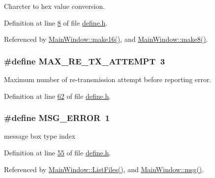 Charcter to hex value conversion. 



Definition at line \hyperlink{a00034_source_l00008}{8} of file \hyperlink{a00034_source}{define.\+h}.



Referenced by \hyperlink{a00048_source_l00013}{Main\+Window\+::make16()}, and \hyperlink{a00048_source_l00005}{Main\+Window\+::make8()}.

\hypertarget{a00034_ae024113875b4670b57f70611ff982543}{
\subsubsection[{M\+A\+X\+\_\+\+R\+E\+\_\+\+T\+X\+\_\+\+A\+T\+T\+E\+M\+P\+T}]{\setlength{\rightskip}{0pt plus 5cm}\#define M\+A\+X\+\_\+\+R\+E\+\_\+\+T\+X\+\_\+\+A\+T\+T\+E\+M\+P\+T~3}}\label{a00034_ae024113875b4670b57f70611ff982543}


Maximum number of re-\/transmission attempt before reporting error. 



Definition at line \hyperlink{a00034_source_l00062}{62} of file \hyperlink{a00034_source}{define.\+h}.

\hypertarget{a00034_aa8a990825a5a62c89d2fb8b08d8a1070}{
\subsubsection[{M\+S\+G\+\_\+\+E\+R\+R\+O\+R}]{\setlength{\rightskip}{0pt plus 5cm}\#define M\+S\+G\+\_\+\+E\+R\+R\+O\+R~1}}\label{a00034_aa8a990825a5a62c89d2fb8b08d8a1070}


message box type index 



Definition at line \hyperlink{a00034_source_l00055}{55} of file \hyperlink{a00034_source}{define.\+h}.



Referenced by \hyperlink{a00038_source_l00308}{Main\+Window\+::\+List\+Files()}, and \hyperlink{a00038_source_l00145}{Main\+Window\+::msg()}.

